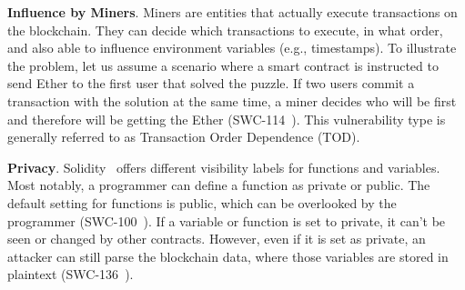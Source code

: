 \textbf{Influence by Miners}. Miners are entities that actually execute transactions on the blockchain. They can decide which transactions to execute, in what order, and also able to influence environment variables (e.g., timestamps). 
To illustrate the problem, let us assume a scenario where a smart contract is instructed to send Ether to the first user that solved the puzzle. If two users commit a transaction with the solution at the same time, a miner decides who will be first and therefore will be getting the Ether (SWC-114~\cite{swcregistry}). This vulnerability type is generally referred to as Transaction Order Dependence (TOD).

\textbf{Privacy}. Solidity~\cite{solidity} offers different visibility labels for functions and variables. Most notably, a programmer can define a function as private or public. The default setting for functions is public, which can be overlooked by the programmer (SWC-100~\cite{swcregistry}). If a variable or function is set to private, it can't be seen or changed by other contracts. However, even if it is set as private, an attacker can still parse the blockchain data, where those variables are stored in plaintext (SWC-136~\cite{swcregistry}). 


